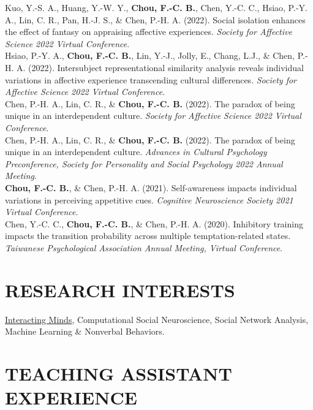 \documentclass[a4paper,12pt]{article}
\newcommand{\sectionspace}{0pt} %
\newcommand{\itemspace}{7pt} %
\begin{document}
\noindent Kuo, Y.-S. A., Huang, Y.-W. Y., \textbf{Chou, F.-C. B.}, Chen, Y.-C. C., Hsiao, P.-Y. A., Lin, C. R., Pan, H.-J. S., \& Chen, P.-H. A. (2022). Social isolation enhances the effect of fantasy on appraising affective experiences. \textit{Society for Affective Science 2022 Virtual Conference}.\\[\itemspace]
\noindent Hsiao, P.-Y. A., \textbf{Chou, F.-C. B.}, Lin, Y.-J., Jolly, E., Chang, L.J., \& Chen, P.-H. A. (2022). Intersubject representational similarity analysis reveals individual variations in affective experience transcending cultural differences. \textit{Society for Affective Science 2022 Virtual Conference}.\\[\itemspace]
\noindent Chen, P.-H. A., Lin, C. R., \& \textbf{Chou, F.-C. B.} (2022). The paradox of being unique in an interdependent culture. \textit{Society for Affective Science 2022 Virtual Conference}.\\[\itemspace]
\noindent Chen, P.-H. A., Lin, C. R., \& \textbf{Chou, F.-C. B.} (2022). The paradox of being unique in an interdependent culture. \textit{Advances in Cultural Psychology Preconference, Society for Personality and Social Psychology 2022 Annual Meeting}.\\[\itemspace]
\noindent \textbf{Chou, F.-C. B.}, \& Chen, P.-H. A. (2021). Self-awareness impacts individual variations in perceiving appetitive cues. \textit{Cognitive Neuroscience Society 2021 Virtual Conference}.\\[\itemspace]
\noindent Chen, Y.-C. C., \textbf{Chou, F.-C. B.}, \& Chen, P.-H. A. (2020). Inhibitory training impacts the transition probability across multiple temptation-related states. \textit{Taiwanese Psychological Association Annual Meeting, Virtual Conference}.

\vspace{\sectionspace}

\section*{RESEARCH INTERESTS}
\href{https://www.interactingminds.com}{Interacting Minds}, Computational Social Neuroscience, Social Network Analysis, Machine Learning \& Nonverbal Behaviors. \\[\sectionspace]

\vspace{\sectionspace}

\section*{TEACHING ASSISTANT EXPERIENCE}
\end{document}
